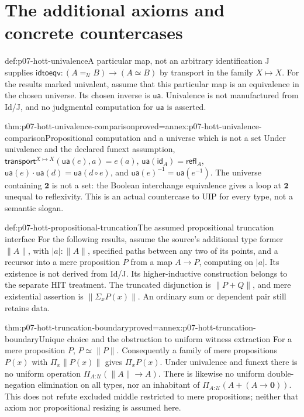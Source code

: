 \section{The additional axioms and concrete countercases}
\label{sec:p07-hott-axioms-and-boundaries}

\begin{hbdefinition}{def:p07-hott-univalence}{A particular map, not an arbitrary identification}
J supplies $\mathsf{idtoeqv}:(A=_{\mathcal U}B)\to(A\simeq B)$ by transport
in the family $X\mapsto X$. For the results marked univalent, assume
that this particular map is an equivalence in the chosen universe.
Its chosen inverse is $\mathsf{ua}$. Univalence is not manufactured
from Id/J, and no judgmental computation for $\mathsf{ua}$ is asserted.
\end{hbdefinition}

\begin{hbtheorem}{thm:p07-hott-univalence-comparison}{proved=annex:p07-hott-univalence-comparison}{Propositional computation and a universe which is not a set}
Under univalence and the declared funext assumption,
$\mathsf{transport}^{X\mapsto X}(\mathsf{ua}(e),a)=e(a)$,
$\mathsf{ua}(\mathsf{id}_A)=\mathsf{refl}_A$,
$\mathsf{ua}(e)\cdot\mathsf{ua}(d)=\mathsf{ua}(d\circ e)$, and
$\mathsf{ua}(e)^{-1}=\mathsf{ua}(e^{-1})$.
The universe containing $\mathbf2$ is not a set: the Boolean interchange
equivalence gives a loop at $\mathbf2$ unequal to reflexivity.
This is an actual countercase to UIP for every type, not a semantic slogan.
\end{hbtheorem}

\begin{hbdefinition}{def:p07-hott-propositional-truncation}{The assumed propositional truncation interface}
For the following results, assume the source's additional type former
$\|A\|$, with $|a|:\|A\|$, specified paths between any two of its points,
and a recursor into a mere proposition $P$ from a map $A\to P$, computing
on $|a|$. Its existence is not derived from Id/J. Its higher-inductive
construction belongs to the separate HIT treatment.
The truncated disjunction is $\|P+Q\|$, and mere existential assertion is
$\|\Sigma_xP(x)\|$. An ordinary sum or dependent pair still retains data.
\end{hbdefinition}

\begin{hbtheorem}{thm:p07-hott-truncation-boundary}{proved=annex:p07-hott-truncation-boundary}{Unique choice and the obstruction to uniform witness extraction}
For a mere proposition $P$, $P\simeq\|P\|$. Consequently a family
of mere propositions $P(x)$ with $\Pi_x\|P(x)\|$ gives $\Pi_xP(x)$.
Under univalence and funext there is no uniform operation
$\Pi_{A:\mathcal U}(\|A\|\to A)$.
There is likewise no uniform double-negation elimination on all types,
nor an inhabitant of $\Pi_{A:\mathcal U}(A+(A\to\mathbf0))$.
This does not refute excluded middle restricted to mere propositions;
neither that axiom nor propositional resizing is assumed here.
\end{hbtheorem}

